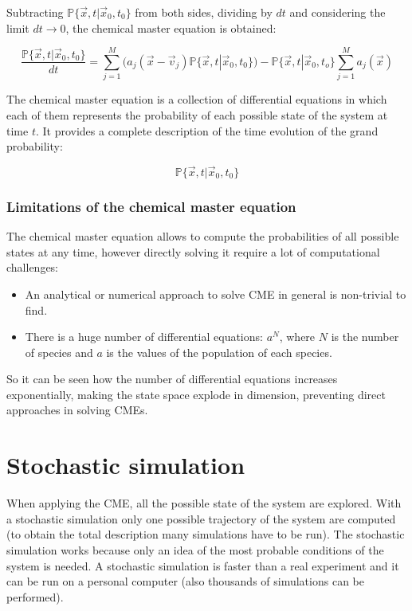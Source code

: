       Subtracting $\mathbb{P}\{\vec{x}, t|\vec{x}_0, t_0\}$ from both sides, dividing by $dt$ and considering the limit $dt\rightarrow 0$, the chemical master equation is obtained:

    $$\frac{\mathbb{P}\{\vec{x},t|\vec{x}_0,t_0\}}{dt}= \sum_{j=1}^{M}(a_j(\vec{x}-\vec{v}_j)\mathbb{P}\{\vec{x},t|\vec{x}_0,t_0\})- \mathbb{P}\{\vec{x},t|\vec{x}_0,t_o\}\sum^M_{j=1}a_j(\vec{x})$$

    The chemical master equation is a collection of differential equations in which each of them represents the probability of each possible state of the system at time $t$.
    It provides a complete description of the time evolution of the grand probability:

    $$\mathbb{P}\{\vec{x}, t|\vec{x}_0, t_0\}$$


    \subsubsection{Limitations of the chemical master equation}
    The chemical master equation allows to compute the probabilities of all possible states at any time, however directly solving it require a lot of computational challenges:

    \begin{multicols}{2}
      \begin{itemize}
        \item An analytical or numerical approach to solve CME in general is non-trivial to find.
        \item There is a huge number of differential equations: $a^N$, where $N$ is the number of species and $a$ is the values of the population of each species.
      \end{itemize}
    \end{multicols}

    So it can be seen how the number of differential equations increases exponentially, making the state space explode in dimension, preventing direct approaches in solving CMEs.

\section{Stochastic simulation}
When applying the CME, all the possible state of the system are explored.
With a stochastic simulation only one possible trajectory of the system are computed (to obtain the total description many simulations have to be run).
The stochastic simulation works because only an idea of the most probable conditions of the system is needed.
A stochastic simulation is faster than a real experiment and it can be run on a personal computer (also thousands of simulations can be performed).

